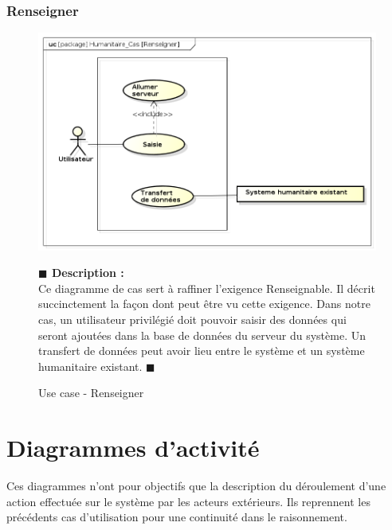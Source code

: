 \documentclass[11pt, titlepage]{report}
\newcommand{\debutDescription}{\noindent\textbf{\textcolor{DescriptionColor}{$\blacksquare$  Description : \\}}}
\newcommand{\finDescription}{\noindent\textcolor{DescriptionColor}{$\blacksquare$}}
\begin{document}
\subsubsection{Renseigner}
\begin{figure}[h!]
\begin{center}
\includegraphics[scale=.4]{../images/diagrammes/sysml/use_case/renseigner.png}
\end{center}
\caption{Use case - Renseigner}
\debutDescription
Ce diagramme de cas sert à raffiner l'exigence Renseignable. Il décrit succinctement la façon dont peut être vu cette exigence. Dans notre cas, un utilisateur privilégié doit pouvoir saisir des données qui seront ajoutées dans la base de données du serveur du système. Un transfert de données peut avoir lieu entre le système et un système humanitaire existant.
\finDescription
\end{figure}


\clearpage
\section{Diagrammes d'activité}
Ces diagrammes n'ont pour objectifs que la description du déroulement d'une action effectuée sur le système par les acteurs extérieurs. Ils reprennent les précédents cas d'utilisation pour une continuité dans le raisonnement.
\end{document}
